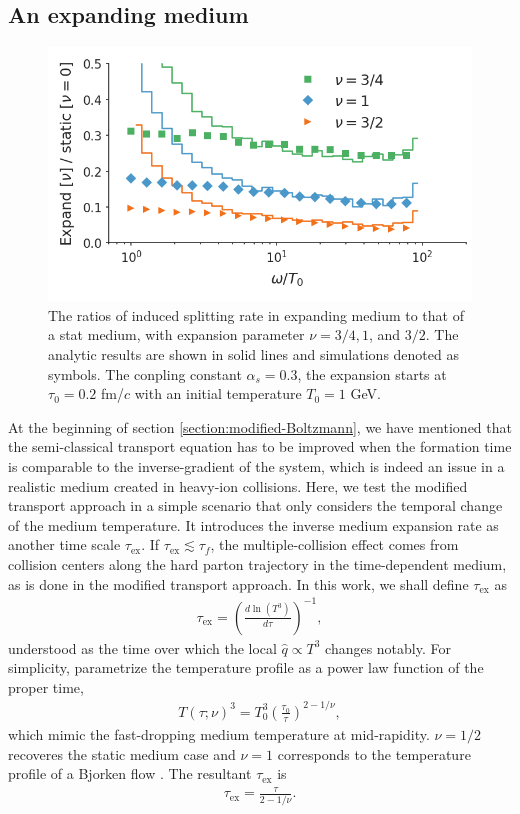 \documentclass[aps, prc, reprint, amsmath, groupedaddress, nofootinbib]{revtex4-1}
\begin{document}
\subsection{An expanding medium}
\begin{figure}
\includegraphics[width=\columnwidth]{spectrum_Bjorken.png}
\caption{The ratios of induced splitting rate in expanding medium to that of a stat medium, with expansion parameter $\nu = 3/4, 1$, and $3/2$. The analytic results are shown in solid lines and simulations denoted as symbols. The conpling constant $\alpha_s=0.3$, the expansion starts at $\tau_0 = 0.2$ fm/$c$ with an initial temperature $T_0 = 1$ GeV.}
\label{fig:Bjorken-BDMPS}
\end{figure}

At the beginning of section \ref{section:modified-Boltzmann}, we have mentioned that the semi-classical transport equation has to be improved when the formation time is comparable to the inverse-gradient of the system, which is indeed an issue in a realistic medium created in heavy-ion collisions.
Here, we test the modified transport approach in a simple scenario that only considers the temporal change of the medium temperature. 
It introduces the inverse medium expansion rate as another time scale $\tau_{\textrm{ex}}$. 
If $\tau_{\textrm{ex}} \lesssim \tau_f$, the multiple-collision effect comes from collision centers along the hard parton trajectory in the time-dependent medium, as is done in the modified transport approach.
In this work, we shall define $\tau_{\textrm{ex}}$ as
\begin{eqnarray}
\tau_{\textrm{ex}} = \left(\frac{d\ln(T^3)}{d \tau} \right)^{-1},
\end{eqnarray}
understood as the time over which the local $\hat{q}\propto T^3$ changes notably.
For simplicity, parametrize the temperature profile as a power law function of the proper time,
\begin{eqnarray}
T(\tau; \nu)^3 = T_0^3\left(\frac{\tau_0}{\tau}\right)^{2-1/\nu},
\label{eq:temperature}
\end{eqnarray}
which mimic the fast-dropping medium temperature at mid-rapidity.
$\nu=1/2$  recoveres the static medium case and $\nu=1$ corresponds to the temperature profile of a Bjorken flow \cite{PhysRevD.27.140}.
The resultant $\tau_{\textrm{ex}}$ is
\begin{eqnarray}
\tau_{\textrm{ex}} = \frac{\tau}{2-1/\nu}.
\end{eqnarray}
\end{document}
